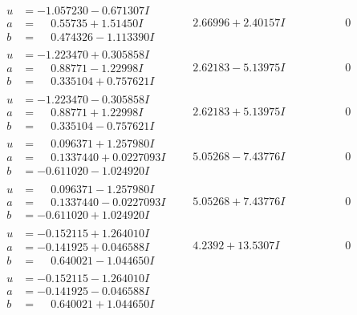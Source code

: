 \documentclass[1p]{elsarticle_modified}
\theoremstyle{definition}
\begin{document}
$$\begin{array}{c|c|c}
\begin{aligned}
u &= -1.057230 - 0.671307 I \\
a &= \phantom{-}0.55735 + 1.51450 I \\
b &= \phantom{-}0.474326 - 1.113390 I\end{aligned}
 & \phantom{-}2.66996 + 2.40157 I & \phantom{-0.000000 } 0 \\ \hline\begin{aligned}
u &= -1.223470 + 0.305858 I \\
a &= \phantom{-}0.88771 - 1.22998 I \\
b &= \phantom{-}0.335104 + 0.757621 I\end{aligned}
 & \phantom{-}2.62183 - 5.13975 I & \phantom{-0.000000 } 0 \\ \hline\begin{aligned}
u &= -1.223470 - 0.305858 I \\
a &= \phantom{-}0.88771 + 1.22998 I \\
b &= \phantom{-}0.335104 - 0.757621 I\end{aligned}
 & \phantom{-}2.62183 + 5.13975 I & \phantom{-0.000000 } 0 \\ \hline\begin{aligned}
u &= \phantom{-}0.096371 + 1.257980 I \\
a &= \phantom{-}0.1337440 + 0.0227093 I \\
b &= -0.611020 - 1.024920 I\end{aligned}
 & \phantom{-}5.05268 - 7.43776 I & \phantom{-0.000000 } 0 \\ \hline\begin{aligned}
u &= \phantom{-}0.096371 - 1.257980 I \\
a &= \phantom{-}0.1337440 - 0.0227093 I \\
b &= -0.611020 + 1.024920 I\end{aligned}
 & \phantom{-}5.05268 + 7.43776 I & \phantom{-0.000000 } 0 \\ \hline\begin{aligned}
u &= -0.152115 + 1.264010 I \\
a &= -0.141925 + 0.046588 I \\
b &= \phantom{-}0.640021 - 1.044650 I\end{aligned}
 & \phantom{-}4.2392 + 13.5307 I & \phantom{-0.000000 } 0 \\ \hline\begin{aligned}
u &= -0.152115 - 1.264010 I \\
a &= -0.141925 - 0.046588 I \\
b &= \phantom{-}0.640021 + 1.044650 I\end{aligned}

\end{array}$$
\end{document}
